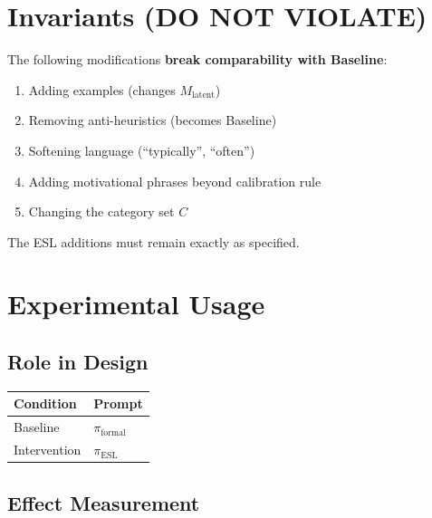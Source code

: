 \documentclass[11pt,a4paper]{article}
\begin{document}
\section{Invariants (DO NOT VIOLATE)}

\begin{warningbox}
The following modifications \textbf{break comparability with Baseline}:

\begin{enumerate}
    \item[$\times$] Adding examples (changes $M_{\text{latent}}$)
    \item[$\times$] Removing anti-heuristics (becomes Baseline)
    \item[$\times$] Softening language (``typically'', ``often'')
    \item[$\times$] Adding motivational phrases beyond calibration rule
    \item[$\times$] Changing the category set $C$
\end{enumerate}

The ESL additions must remain exactly as specified.
\end{warningbox}


\section{Experimental Usage}

\subsection{Role in Design}

\begin{table}[h]
\centering
\begin{tabular}{ll}
\toprule
\textbf{Condition} & \textbf{Prompt} \\
\midrule
Baseline & $\pi_{\text{formal}}$ \\
Intervention & $\pi_{\text{ESL}}$ \\
\bottomrule
\end{tabular}
\end{table}

\subsection{Effect Measurement}
\end{document}
